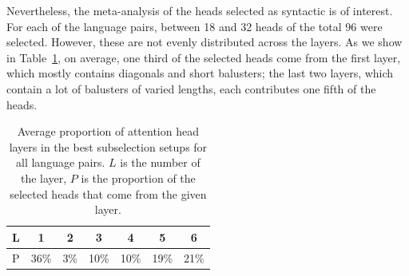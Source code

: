 \documentclass[11pt,a4paper]{article}
\def\RR#1{{\color{blue}RR: \it #1}}
\def\DEL#1{{\color{green}SMAZAT: \it #1}}
\def\RR#1{}
\def\DEL#1{}
\begin{document}
Nevertheless, the meta-analysis of the heads selected as syntactic is of interest.
For each of the language pairs, between 18 and 32 heads of the total 96 were selected.
However, these are not evenly distributed across the layers.
As we show in Table~\ref{tab:headlayers}, on average, one third of the selected heads come from the first layer, which mostly contains diagonals and short balusters; the last two layers, which contain a lot of balusters of varied lengths, each contributes one fifth of the heads.

\begin{table}[t]
\centering
\begin{tabular}{l|cccccc}
L & 1 & 2 & 3 & 4 & 5 & 6 \\
\hline
P & 36\% & 3\% & 10\% & 10\% & 19\% & 21\% \\
\end{tabular}
\caption{Average proportion of attention head layers in the best subselection setups for all language pairs. $L$ is the number of the layer, $P$ is the proportion of the selected heads that come from the given layer.}
\label{tab:headlayers}
\end{table}



\DEL{
\subsection{Heuristic}
%
To compute balustradeness: Go over a column, multiply neighbouring squares, sum up, sum up over all columns, divide by N+1 (N=number of tokens) and multiply by 4 (to get into the 0-1 interval).
Separates some of the patterns but not all of them.
Highest are parallel diagonals, ten balustrades or watching the end, then rubbish, then diagonal.}
\end{document}

